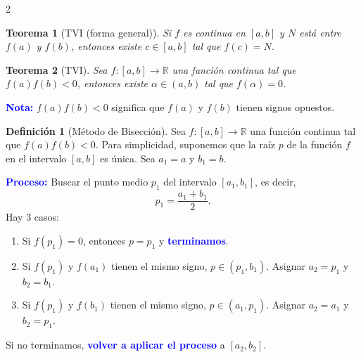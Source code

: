 \documentclass[letterpaper,12pt]{article}
\theoremstyle{plain}
\newtheorem{teo}{Teorema}
\theoremstyle{definition}
\newtheorem{defi}{Definici\'on}
\newcommand{\1}{\mathbbm{1}}
\begin{document}
\begin{tcolorbox}[title = Resumen, colframe=cyan!80!black, colback=cyan!5!white, boxrule=0.8pt, arc=4pt, auto outer arc]
\begin{multicols}{2}
\begin{teo}[TVI (forma general)] Si \( f \) es continua en \( [a, b] \) y \( N \) está entre \( f(a) \) y \( f(b) \), entonces existe \( c \in [a, b] \) tal que \( f(c) = N \).
\end{teo}

\begin{teo}[TVI]
Sea \( f : [a,b] \to \mathbb{R} \) una función continua tal que \( f(a)f(b) < 0 \), entonces existe \( \alpha \in (a,b) \) tal que \( f(\alpha) = 0 \).
\end{teo}
\textbf{\textcolor{blue}{Nota:}} \( f(a)f(b) < 0 \) significa que \( f(a) \) y \( f(b) \) tienen signos opuestos.

\begin{defi}[Método de Bisección] Sea \( f : [a, b] \to \mathbb{R} \) una función continua tal que \( f(a)f(b) < 0 \). Para simplicidad, suponemos que la raíz \( p \) de la función \( f \) en el intervalo \( [a, b] \) es única. Sea \( a_1 = a \) y \( b_1 = b \).

\textbf{\textcolor{blue}{Proceso:}} Buscar el punto medio \( p_1 \) del intervalo \( [a_1, b_1] \), es decir,
    \[
    p_1 = \frac{a_1 + b_1}{2}.
    \]
Hay 3 casos:
    \begin{enumerate}
        \item Si \( f(p_1) = 0 \), entonces \( p = p_1 \) y \textbf{\textcolor{blue}{terminamos}}.
        \item Si \( f(p_1) \) y \( f(a_1) \) tienen el mismo signo, \( p \in (p_1, b_1) \). Asignar \( a_2 = p_1 \) y \( b_2 = b_1 \).
        \item Si \( f(p_1) \) y \( f(b_1) \) tienen el mismo signo, \( p \in (a_1, p_1) \). Asignar \( a_2 = a_1 \) y \( b_2 = p_1 \).
    \end{enumerate}
Si no terminamos, \textbf{\textcolor{blue}{volver a aplicar el proceso}} a \( [a_2, b_2] \).
\end{defi}



\end{multicols}
\end{tcolorbox}
\end{document}

